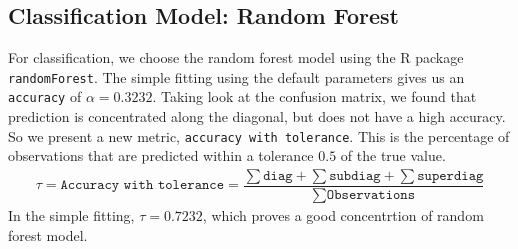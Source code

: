 \documentclass[8pt]{report}
\begin{document}
\subsection{Classification Model: Random Forest}
For classification, we choose the random forest model using the R package \texttt{randomForest}.
The simple fitting using the default parameters gives us an \texttt{accuracy} of $\alpha = 0.3232$. 
Taking look at the confusion matrix, we found that prediction is concentrated along the diagonal, 
but does not have a high accuracy. So we present a new metric, \texttt{accuracy with tolerance}. 
This is the percentage of observations that are predicted within a tolerance $0.5$ of the true value.
\begin{align*}
    \tau = \texttt{Accuracy with tolerance} = \dfrac{\sum \texttt{diag} + \sum \texttt{subdiag} + \sum \texttt{superdiag}}{\sum \texttt{Observations}}
\end{align*}
In the simple fitting, $\tau = 0.7232$, which proves a good concentrtion of random forest model. 
\end{document}
